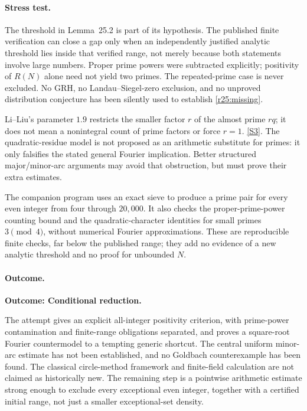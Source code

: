 \documentclass[11pt,a4paper]{article}
\newcommand{\sref}[2]{\hyperlink{source:#1:#2}{[S#2]}}
\numberwithin{equation}{section}
\begin{document}
\paragraph{Stress test.}
The threshold in Lemma~25.2 is part of its hypothesis. The published
finite verification can close a gap only when an independently justified
analytic threshold lies inside that verified range, not merely because
both statements involve large numbers. Proper prime powers were
subtracted explicitly; positivity of $R(N)$ alone need not yield two
primes. The repeated-prime case is never excluded. No GRH, no
Landau--Siegel-zero exclusion, and no unproved distribution conjecture
has been silently used to establish \eqref{r25:missing}.

Li--Liu's parameter $1.9$ restricts the smaller factor $r$ of the almost
prime $rq$; it does not mean a nonintegral count of prime factors or force
$r=1$. \sref{12}{3}. The quadratic-residue model is not proposed as an
arithmetic substitute for primes: it only falsifies the stated general
Fourier implication. Better structured major/minor-arc arguments may
avoid that obstruction, but must prove their extra estimates.

The companion program uses an exact sieve to produce a prime pair for
every even integer from four through $20{,}000$. It also checks the
proper-prime-power counting bound and the quadratic-character identities
for small primes $3\pmod4$, without numerical Fourier approximations.
These are reproducible finite checks, far below the published range;
they add no evidence of a new analytic threshold and no proof for
unbounded $N$.

\paragraph{Outcome.}
\textbf{Outcome: Conditional reduction.}

The attempt gives an explicit all-integer positivity criterion, with
prime-power contamination and finite-range obligations separated, and
proves a square-root Fourier countermodel to a tempting generic shortcut.
The central uniform minor-arc estimate has not been established, and no
Goldbach counterexample has been found. The classical circle-method
framework and finite-field calculation are not claimed as historically
new. The remaining step is a pointwise arithmetic estimate strong enough
to exclude every exceptional even integer, together with a certified
initial range, not just a smaller exceptional-set density.
\end{document}
